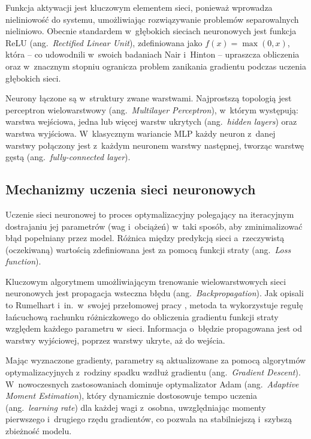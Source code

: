 Funkcja aktywacji jest kluczowym elementem sieci, ponieważ wprowadza nieliniowość do systemu, umożliwiając rozwiązywanie problemów separowalnych nieliniowo. Obecnie standardem w~głębokich sieciach neuronowych jest funkcja ReLU (ang.\ \emph{Rectified Linear Unit}), zdefiniowana jako $f(x) = \max(0, x)$, która – co udowodnili w~swoich badaniach Nair i~Hinton \cite{Nair2010} – upraszcza obliczenia oraz w~znacznym stopniu ogranicza problem zanikania gradientu podczas uczenia głębokich sieci.

Neurony łączone są w~struktury zwane warstwami. Najprostszą topologią jest perceptron wielowarstwowy (ang.\ \emph{Multilayer Perceptron}), w~którym występują: warstwa wejściowa, jedna lub więcej warstw ukrytych (ang.\ \emph{hidden layers}) oraz warstwa wyjściowa. W~klasycznym wariancie MLP każdy neuron z~danej warstwy połączony jest z~każdym neuronem warstwy następnej, tworząc warstwę gęstą (ang.\ \emph{fully-connected layer}).

\subsection{Mechanizmy uczenia sieci neuronowych}

Uczenie sieci neuronowej to proces optymalizacyjny polegający na iteracyjnym dostrajaniu jej parametrów (wag i~obciążeń) w~taki sposób, aby zminimalizować błąd popełniany przez model. Różnica między predykcją sieci a~rzeczywistą (oczekiwaną) wartością zdefiniowana jest za pomocą funkcji straty (ang.\ \emph{Loss function}).

Kluczowym algorytmem umożliwiającym trenowanie wielowarstwowych sieci neuronowych jest propagacja wsteczna błędu (ang.\ \emph{Backpropagation}). Jak opisali to Rumelhart i~in.\ w~swojej przełomowej pracy \cite{Rumelhart1986}, metoda ta wykorzystuje regułę łańcuchową rachunku różniczkowego do obliczenia gradientu funkcji straty względem każdego parametru w~sieci. Informacja o~błędzie propagowana jest od warstwy wyjściowej, poprzez warstwy ukryte, aż do wejścia.

Mając wyznaczone gradienty, parametry są aktualizowane za pomocą algorytmów optymalizacyjnych z~rodziny spadku wzdłuż gradientu (ang.\ \emph{Gradient Descent}). W~nowoczesnych zastosowaniach dominuje optymalizator Adam \cite{Kingma2014} (ang.\ \emph{Adaptive Moment Estimation}), który dynamicznie dostosowuje tempo uczenia (ang.\ \emph{learning rate}) dla każdej wagi z~osobna, uwzględniając momenty pierwszego i~drugiego rzędu gradientów, co pozwala na stabilniejszą i~szybszą zbieżność modelu.

